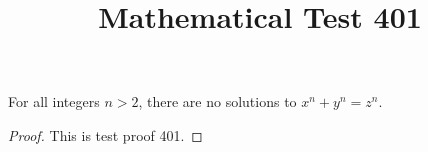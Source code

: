 \documentclass{amsart}
\begin{document}
\title{Mathematical Test 401}
\begin{theorem}
For all integers $n > 2$, there are no solutions to $x^n + y^n = z^n$.
\end{theorem}
\begin{proof}
This is test proof 401.
\end{proof}
\end{document}
